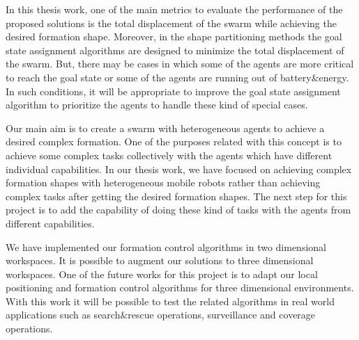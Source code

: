 In this thesis work, one of the main metrics to evaluate the performance of the proposed solutions is the total displacement of the swarm while achieving the desired formation shape. Moreover, in the shape partitioning methods the goal state assignment algorithms are designed to minimize the total displacement of the swarm. But, there may be cases in which some of the agents are more critical to reach the goal state or some of the agents are running out of battery$\&$energy. In such conditions, it will be appropriate to improve the goal state assignment algorithm to prioritize the agents to handle these kind of special cases. 
    
Our main aim is to create a swarm with heterogeneous agents to achieve a desired complex formation. One of the purposes related with this concept is to achieve some complex tasks collectively with the agents which have different individual capabilities. In our thesis work, we have focused on achieving complex formation shapes with heterogeneous mobile robots rather than achieving complex tasks after getting the desired formation shapes. The next step for this project is to add the capability of doing these kind of tasks with the agents from different capabilities.

We have implemented our formation control algorithms in two dimensional workspaces. It is possible to augment our solutions to three dimensional workspaces. One of the future works for this project is to adapt our local positioning and formation control algorithms for three dimensional environments. With this work it will be possible to test the related algorithms in real world applications such as search$\&$rescue operations, surveillance and coverage operations.
		
		
		
		
		
		
		
		
		
		
		
		
		
		
		
		